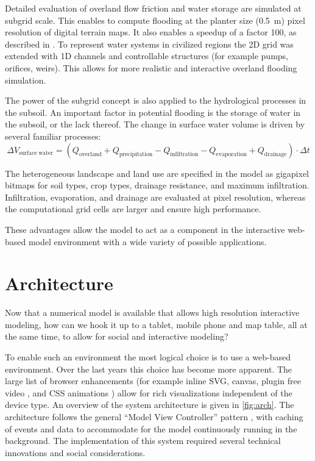 \documentclass[a4paper]{article}
\begin{document}
Detailed evaluation of overland flow friction and water storage are simulated at subgrid scale. This enables to compute flooding at the planter size (\SI{0.5}{\meter}) pixel resolution of digital terrain maps. It also enables a speedup of a factor 100, as described in \citet{Stelling2012}. To represent water systems in civilized regions the 2D grid was extended with 1D channels and controllable structures (for example pumps, orifices, weirs). This allows for more realistic and interactive overland flooding simulation.

The power of the subgrid concept is also applied to the hydrological processes in the subsoil. An important factor in potential flooding is the storage of water in the subsoil, or the lack thereof. The change in surface water volume is driven by several familiar processes:
\[
\Delta V_\mathrm{surface\ water} = (Q_\mathrm{overland} + Q_\mathrm{precipitation} - Q_\mathrm{infiltration} - Q_\mathrm{evaporation} + Q_\mathrm{drainage})\cdot\Delta t
\]

The heterogeneous landscape and land use are specified in the model as gigapixel bitmaps for soil types, crop types, drainage resistance, and maximum infiltration. Infiltration, evaporation, and drainage are evaluated at pixel resolution, whereas the computational grid cells are larger and ensure high performance.

These advantages allow the model to act as a component in the interactive web-based model environment with a wide variety of possible applications.


\section{Architecture}
Now that a numerical model is available that allows high resolution interactive modeling, how can we hook it up to a tablet, mobile phone and map table, all at the same time, to allow for social and interactive modeling?

To enable such an environment the most logical choice is to use a web-based environment. Over the last years this choice has become more apparent. The large list of browser enhancements (for example inline \ac{SVG}, canvas, plugin free video \citep{Berjon2014}, and \ac{CSS} animations \citep{Jackson2013}) allow for rich visualizations independent of the device type. An overview of the system architecture is given in \autoref{fig:arch}. The architecture follows the general ``Model View Controller'' pattern \citep{Gamma1994}, with caching of events and data to accommodate for the model continuously running in the background. The implementation of this system required several technical innovations and social considerations.
\end{document}
